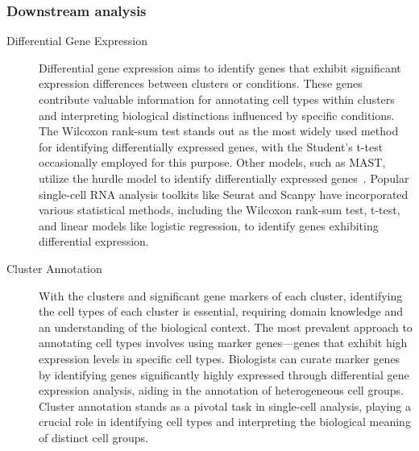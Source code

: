 \subsubsection{Downstream analysis}
\begin{description}
	\item[Differential Gene Expression]
	Differential gene expression aims to identify genes that exhibit significant expression differences between clusters or conditions. These genes contribute valuable information for annotating cell types within clusters and interpreting biological distinctions influenced by specific conditions. The Wilcoxon rank-sum test stands out as the most widely used method for identifying differentially expressed genes, with the Student's t-test occasionally employed for this purpose. Other models, such as MAST, utilize the hurdle model to identify differentially expressed genes~\citep{finak2015mast}. Popular single-cell RNA analysis toolkits like Seurat and Scanpy have incorporated various statistical methods, including the Wilcoxon rank-sum test, t-test, and linear models like logistic regression, to identify genes exhibiting differential expression.

	\item[Cluster Annotation]
	With the clusters and significant gene markers of each cluster, identifying the cell types of each cluster is essential, requiring domain knowledge and an understanding of the biological context. The most prevalent approach to annotating cell types involves using marker genes—genes that exhibit high expression levels in specific cell types. Biologists can curate marker genes by identifying genes significantly highly expressed through differential gene expression analysis, aiding in the annotation of heterogeneous cell groups. Cluster annotation stands as a pivotal task in single-cell analysis, playing a crucial role in identifying cell types and interpreting the biological meaning of distinct cell groups.


\end{description}
